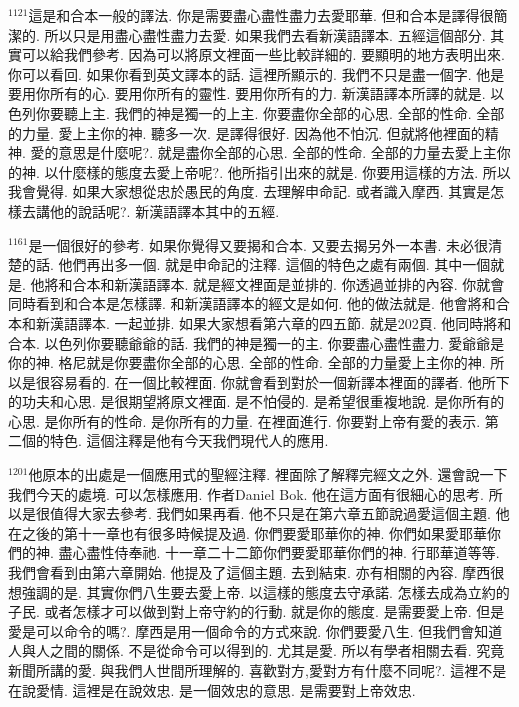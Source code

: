 \documentclass{book}
\begin{document}
$^{1121}$這是和合本一般的譯法.
你是需要盡心盡性盡力去愛耶華.
但和合本是譯得很簡潔的.
所以只是用盡心盡性盡力去愛.
如果我們去看新漢語譯本.
五經這個部分.
其實可以給我們參考.
因為可以將原文裡面一些比較詳細的.
要顯明的地方表明出來.
你可以看回.
如果你看到英文譯本的話.
這裡所顯示的.
我們不只是盡一個字.
他是要用你所有的心.
要用你所有的靈性.
要用你所有的力.
新漢語譯本所譯的就是.
以色列你要聽上主.
我們的神是獨一的上主.
你要盡你全部的心思.
全部的性命.
全部的力量.
愛上主你的神.
聽多一次.
是譯得很好.
因為他不怕沉.
但就將他裡面的精神.
愛的意思是什麼呢?.
就是盡你全部的心思.
全部的性命.
全部的力量去愛上主你的神.
以什麼樣的態度去愛上帝呢?.
他所指引出來的就是.
你要用這樣的方法.
所以我會覺得.
如果大家想從忠於愚民的角度.
去理解申命記.
或者識入摩西.
其實是怎樣去講他的說話呢?.
新漢語譯本其中的五經.

$^{1161}$是一個很好的參考.
如果你覺得又要揭和合本.
又要去揭另外一本書.
未必很清楚的話.
他們再出多一個.
就是申命記的注釋.
這個的特色之處有兩個.
其中一個就是.
他將和合本和新漢語譯本.
就是經文裡面是並排的.
你透過並排的內容.
你就會同時看到和合本是怎樣譯.
和新漢語譯本的經文是如何.
他的做法就是.
他會將和合本和新漢語譯本.
一起並排.
如果大家想看第六章的四五節.
就是202頁.
他同時將和合本.
以色列你要聽爺爺的話.
我們的神是獨一的主.
你要盡心盡性盡力.
愛爺爺是你的神.
格尼就是你要盡你全部的心思.
全部的性命.
全部的力量愛上主你的神.
所以是很容易看的.
在一個比較裡面.
你就會看到對於一個新譯本裡面的譯者.
他所下的功夫和心思.
是很期望將原文裡面.
是不怕侵的.
是希望很重複地說.
是你所有的心思.
是你所有的性命.
是你所有的力量.
在裡面進行.
你要對上帝有愛的表示.
第二個的特色.
這個注釋是他有今天我們現代人的應用.

$^{1201}$他原本的出處是一個應用式的聖經注釋.
裡面除了解釋完經文之外.
還會說一下我們今天的處境.
可以怎樣應用.
作者Daniel Bok.
他在這方面有很細心的思考.
所以是很值得大家去參考.
我們如果再看.
他不只是在第六章五節說過愛這個主題.
他在之後的第十一章也有很多時候提及過.
你們要愛耶華你的神.
你們如果愛耶華你們的神.
盡心盡性侍奉祂.
十一章二十二節你們要愛耶華你們的神.
行耶華道等等.
我們會看到由第六章開始.
他提及了這個主題.
去到結束.
亦有相關的內容.
摩西很想強調的是.
其實你們八生要去愛上帝.
以這樣的態度去守承諾.
怎樣去成為立約的子民.
或者怎樣才可以做到對上帝守約的行動.
就是你的態度.
是需要愛上帝.
但是愛是可以命令的嗎?.
摩西是用一個命令的方式來說.
你們要愛八生.
但我們會知道人與人之間的關係.
不是從命令可以得到的.
尤其是愛.
所以有學者相關去看.
究竟新聞所講的愛.
與我們人世間所理解的.
喜歡對方,愛對方有什麼不同呢?.
這裡不是在說愛情.
這裡是在說效忠.
是一個效忠的意思.
是需要對上帝效忠.
\end{document}

